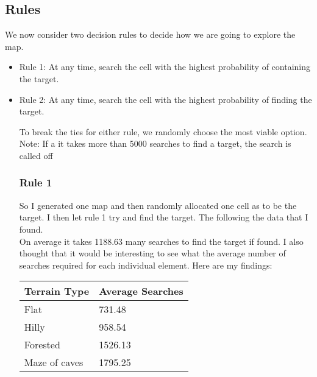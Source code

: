 \documentclass[12pt]{article} %
\begin{document}
\subsection{Rules}
We now consider two decision rules to decide how we are going to explore the map. 
\begin{itemize}
\item Rule 1:  At any time, search the cell with the highest probability of containing the target.
\item Rule 2:  At any time, search the cell with the highest probability of finding the target.

To break the ties for either rule, we randomly choose the most viable option. \\

Note: If a it takes more than 5000 searches to find a target, the search is called off
\subsubsection{Rule 1}
So I generated one map and then randomly allocated one cell as to be the target. I then let rule 1 try and find the target. The following the data that I found. \\
On average it takes 1188.63 many searches to find the target if found. I also thought that it would be interesting to see what the average number of searches required for each individual element. Here are my findings:
\begin{center}
\begin{table}[H]
\begin{tabular}{|l|l|}
\hline
Terrain Type  & Average Searches \\ \hline
Flat          & 731.48           \\ \hline
Hilly         & 958.54           \\ \hline
Forested      & 1526.13          \\ \hline
Maze of caves & 1795.25          \\ \hline
\end{tabular}
\end{table}
\end{center}

\end{itemize}
\end{document}
